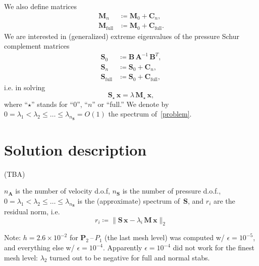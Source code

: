 \documentclass[12pt]{article}
\newcommand{\vect}[1]{\boldsymbol{\mathbf{#1}}}
\begin{document}
We also define matrices 
\begin{align}
	\vect M_n &\coloneqq \vect M_0 + \vect C_n,\\
	\vect M_{\text{full}} &\coloneqq \vect M_0 + \vect C_{\text{full}}.
\end{align}
We are interested in (generalized) extreme eigenvalues of the pressure Schur complement matrices
\begin{align}
	\vect S_0 &\coloneqq \vect B\,\vect A^{-1}\,\vect B^{T},\\
	\vect S_n &\coloneqq \vect S_0 + \vect C_n,\\
	\vect S_{\text{full}} &\coloneqq \vect S_0 + \vect C_{\text{full}},
\end{align}
i.e. in solving
\begin{equation}\label{problem}
	\vect S_\star\,\vect x = \lambda\,\vect M_\star\,\vect x,
\end{equation}
where ``$\star$'' stands for ``$0$'', ``$n$'' or ``full.'' We denote by~$0 = \lambda_1 < \lambda_2 \le \dots \le \lambda_{n_{\vect S}} = O(1)$ the spectrum of~\eqref{problem}.

\section{Solution description}

(TBA)

$n_{\vect A}$ is the number of velocity d.o.f, $n_{\vect S}$ is the number of pressure d.o.f., $0 = \lambda_1 < \lambda_2 \le \dots \le \lambda_{n_{\vect S}}$ is the (approximate) spectrum of~$\vect S$, and $r_i$ are the residual norm, i.e.
$$
	r_i \coloneqq \| \vect S\,\vect x - \lambda_i\,\vect M\,\vect x \|_2
$$ 

Note: $h = 2.6\times10^{-2}$ for $\vect P_2$\,--\,$P_1$ (the last mesh level) was computed w/ $\epsilon = 10^{-5}$, and everything else w/ $\epsilon = 10^{-4}$. Apparently $\epsilon = 10^{-4}$ did not work for the finest mesh level: $\lambda_2$ turned out to be negative for full and normal stabs.
	
\end{document}
